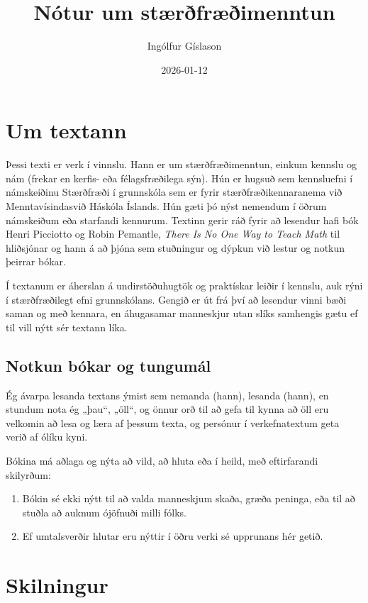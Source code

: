 \documentclass[
  icelandic,
]{book}
\title{Nótur um stærðfræðimenntun}
\author{Ingólfur Gíslason}
\date{2026-01-12}
\begin{document}
\maketitle

{
\setcounter{tocdepth}{1}
\tableofcontents
}
\chapter{Um textann}\label{umtextann}

Þessi texti er verk í vinnslu. Hann er um stærðfræðimenntun, einkum kennslu og nám (frekar en kerfis- eða félagsfræðilega sýn). Hún er hugsuð sem kennsluefni í námskeiðinu Stærðfræði í grunnskóla sem er fyrir stærðfræðikennaranema við Menntavísindasvið Háskóla Íslands. Hún gæti þó nýst nemendum í öðrum námskeiðum eða starfandi kennurum. Textinn gerir ráð fyrir að lesendur hafi bók Henri Picciotto og Robin Pemantle, \emph{There Is No One Way to Teach Math} \autocite{picciotto2025} til hliðsjónar og hann á að þjóna sem stuðningur og dýpkun við lestur og notkun þeirrar bókar.

Í textanum er áherslan á undirstöðuhugtök og praktískar leiðir í kennslu, auk rýni í stærðfræðilegt efni grunnskólans. Gengið er út frá því að lesendur vinni bæði saman og með kennara, en áhugasamar manneskjur utan slíks samhengis gætu ef til vill nýtt sér textann líka.

\section{Notkun bókar og tungumál}\label{notkun-buxf3kar-og-tungumuxe1l}

Ég ávarpa lesanda textans ýmist sem nemanda (hann), lesanda (hann), en stundum nota ég „þau``, „öll``, og önnur orð til að gefa til kynna að öll eru velkomin að lesa og læra af þessum texta, og persónur í verkefnatextum geta verið af ólíku kyni.

Bókina má aðlaga og nýta að vild, að hluta eða í heild, með eftirfarandi skilyrðum:

\begin{enumerate}
\def\labelenumi{\arabic{enumi}.}
\item
  Bókin sé ekki nýtt til að valda manneskjum skaða, græða peninga, eða til að stuðla að auknum ójöfnuði milli fólks.
\item
  Ef umtalsverðir hlutar eru nýttir í öðru verki sé upprunans hér getið.
\end{enumerate}

\chapter{Skilningur}\label{skilningur}
\end{document}

